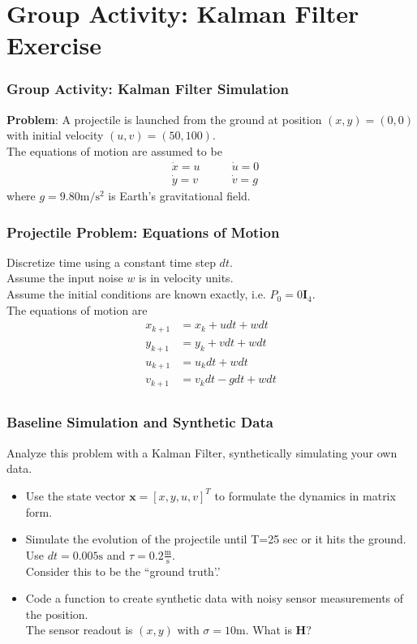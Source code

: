 \documentclass{beamer}
\renewcommand{\vec}[1]{\mathbf{#1}}
\newcommand{\vx}{\vec{x}}
\newcommand{\vH}{\vec{H}}
\newcommand{\Id}{\vec{I}}
\newcommand{\meter}{\text{m}}
\renewcommand{\sec}{\text{s}}
\begin{document}
\section{Group Activity: Kalman Filter Exercise}
\begin{frame}
\frametitle{Group Activity: Kalman Filter Simulation}
\textbf{Problem}: 
A projectile is launched from the ground at position $(x,y) = (0,0)$ 
with initial velocity $(u, v) = (50, 100)$. \\ \smallskip
The equations of motion are assumed to be
\begin{equation}
\begin{aligned}
&\dot{x} = u  \quad \quad & \dot{u} = 0 \\
&\dot{y} = v  \quad \quad  & \dot{v} = g
\end{aligned}
\end{equation}
where $g = 9.80 \text{m}/\text{s}^2$ is Earth's gravitational field. \\
\end{frame}

\begin{frame}
\frametitle{Projectile Problem: Equations of Motion}
Discretize time using a constant time step $dt$. \\ \smallskip
Assume the input noise $w$ is in velocity units.  \\ \smallskip
Assume the initial conditions are known exactly, i.e. $P_0 = 0 \Id_4$. \\
The equations of motion are
\begin{equation}
\begin{aligned}
x_{k+1} &= x_k + u  dt + w dt \\
y_{k+1} &= y_k + v  dt + w dt \\
u_{k+1} &= u_k dt + w dt \\
v_{k+1} &= v_k dt - g dt + w dt \\
\end{aligned}
\end{equation}
\end{frame}

\begin{frame}
\frametitle{Baseline Simulation and Synthetic Data}
Analyze this problem with a Kalman Filter, synthetically simulating your own data.
\begin{itemize}
\item Use the state vector $\vx = [x, y, u, v]^T$ to formulate the dynamics in matrix form.
\item Simulate the evolution of the projectile until T=25 sec or it hits the ground.
Use $dt = 0.005 \sec$ and $\tau = 0.2 \frac{\meter}{\sec}$. \\
Consider this to be the ``ground truth'.'
\item Code a function to create synthetic data with noisy sensor measurements of the position. \\ 
The sensor readout is $(x, y)$ with $\sigma = 10 \text{m}$. What is $\vH$?
\end{itemize}
\end{frame}
\end{document}
